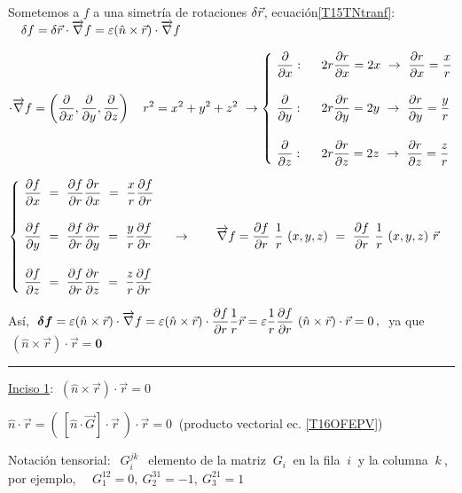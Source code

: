 Sometemos a $f$ a una simetría de rotaciones $\var \vec r$, ecuación\ref{T15TNtranf}:
$\quad \var f=\var \vec r \cdot \overrightarrow \nabla f=\varepsilon (\hat n\times \vec r)\cdot \overrightarrow \nabla f$

$\cdot \overrightarrow \nabla f=\displaystyle \left( \pdv x , \pdv y, \pdv z\right) \quad r^2=x^2+y^2+z^2 \ \to \begin{cases}
\ \displaystyle  \pdv{x}: \ \ & \displaystyle 2r\pdv{r}{x}=2x \ \to \ \pdv{r}{x}=\dfrac x r \\ \\
\ \displaystyle  \pdv{y}: \ \ & \displaystyle 2r\pdv{r}{y}=2y \ \to \ \pdv{r}{y}=\dfrac y r\\	\\
\ \displaystyle  \pdv{z}: \ \ & \displaystyle 2r\pdv{r}{z}=2z 	 \ \to \ \pdv{r}{z}=\dfrac z r
 \end{cases} $
 
 $\begin{cases}
\ \displaystyle \pdv{f}{x} \ = \ \pdv{f}{r}\pdv{r}{x} \ =\ 	\dfrac x r \pdv{f}{r} \\ \\
\ \displaystyle \pdv{f}{y} \ = \ \pdv{f}{r}\pdv{r}{y} \ =\ 	\dfrac y r \pdv{f}{r} \\ \\
\ \displaystyle \pdv{f}{z} \ = \ \pdv{f}{r}\pdv{r}{z} \ =\ 	\dfrac z r \pdv{f}{r} 
\end{cases}
\ \to \qquad 
\overrightarrow \nabla f=\displaystyle \pdv{f}{r}\ \dfrac 1 r \ (x,y,z) \ = \ \pdv{f}{r}\ \dfrac 1 r \ (x,y,z) \ \vec r $


Así, $\ \boldsymbol{ \var f }=\varepsilon (\hat n\times \vec r)\cdot \overrightarrow \nabla f = \varepsilon (\hat n\times \vec r)\cdot \displaystyle \pdv{f}{r} \dfrac 1 r \vec r=\varepsilon \dfrac 1 r \pdv{f}{r} \ (\hat n \times \vec r) \cdot \vec r=0\, , \ $ ya que $\ (\hat n \times \vec r)\cdot \vec r= \boldsymbol{ 0 }$ 

\vspace{5mm}
\rule{150pt}{0.1pt} 
\vspace{-3mm}

\underline{Inciso 1}: $\ (\hat n \times \vec r)\cdot \vec r=0$  

$\hat n \cdot \vec r=\left( \ [ \hat n \cdot \overrightarrow G]\cdot \vec r \ \right)\cdot \vec r=0\ $ (producto vectorial ec. \ref{T16OFEPV})

Notación tensorial: $\ \ G_i^{jk}\ \ $ elemento de la matriz $\ G_i \ $ en la fila $\ i \ $ y la columna $\ k \ $, por ejemplo, $	\quad G_1^{12}=0,\ G_2^{31}=-1,\ G_3^{21}=1$

